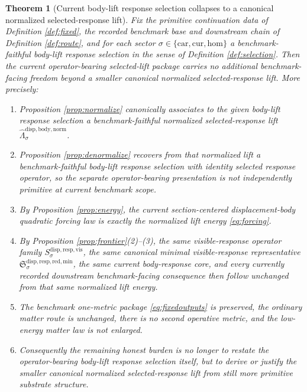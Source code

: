 \documentclass[11pt]{article}
\newcommand{\Car}{\mathrm{car}}
\newcommand{\Cur}{\mathrm{cur}}
\newcommand{\Hom}{\mathrm{hom}}
\newcommand{\VisibleResponseOperator}[1]{S_{#1}^{\mathrm{disp,resp,vis}}}
\newcommand{\MinimalReducedStructure}{\mathfrak S^{\mathrm{disp,resp,red,min}}}
\newcommand{\NormalizedSelectedResponseLift}[1]{\widehat{\Lambda}_{#1}^{\mathrm{disp,body,norm}}}
\newtheorem{theorem}{Theorem}
\begin{document}
\begin{theorem}[Current body-lift response selection collapses to a canonical normalized selected-response lift]
\label{thm:main}
Fix the primitive continuation data of Definition \ref{def:fixed}, the recorded benchmark base and downstream chain of Definition \ref{def:route}, and for each sector \(\sigma\in\{\Car,\Cur,\Hom\}\) a benchmark-faithful body-lift response selection in the sense of Definition \ref{def:selection}. Then the current operator-bearing selected-lift package carries no additional benchmark-facing freedom beyond a smaller canonical normalized selected-response lift. More precisely:
\begin{enumerate}
    \item Proposition \ref{prop:normalize} canonically associates to the given body-lift response selection a benchmark-faithful normalized selected-response lift \(\NormalizedSelectedResponseLift{\sigma}\).
    \item Proposition \ref{prop:denormalize} recovers from that normalized lift a benchmark-faithful body-lift response selection with identity selected response operator, so the separate operator-bearing presentation is not independently primitive at current benchmark scope.
    \item By Proposition \ref{prop:energy}, the current section-centered displacement-body quadratic forcing law is exactly the normalized lift energy \eqref{eq:forcing}.
    \item By Proposition \ref{prop:frontier}(2)--(3), the same visible-response operator family \(\VisibleResponseOperator{\sigma}\), the same canonical minimal visible-response representative \(\MinimalReducedStructure_{\sigma}\), the same current body-response core, and every currently recorded downstream benchmark-facing consequence then follow unchanged from that same normalized lift energy.
    \item The benchmark one-metric package \eqref{eq:fixedoutputs} is preserved, the ordinary matter route is unchanged, there is no second operative metric, and the low-energy matter law is not enlarged.
    \item Consequently the remaining honest burden is no longer to restate the operator-bearing body-lift response selection itself, but to derive or justify the smaller canonical normalized selected-response lift from still more primitive substrate structure.
\end{enumerate}
\end{theorem}
\end{document}
